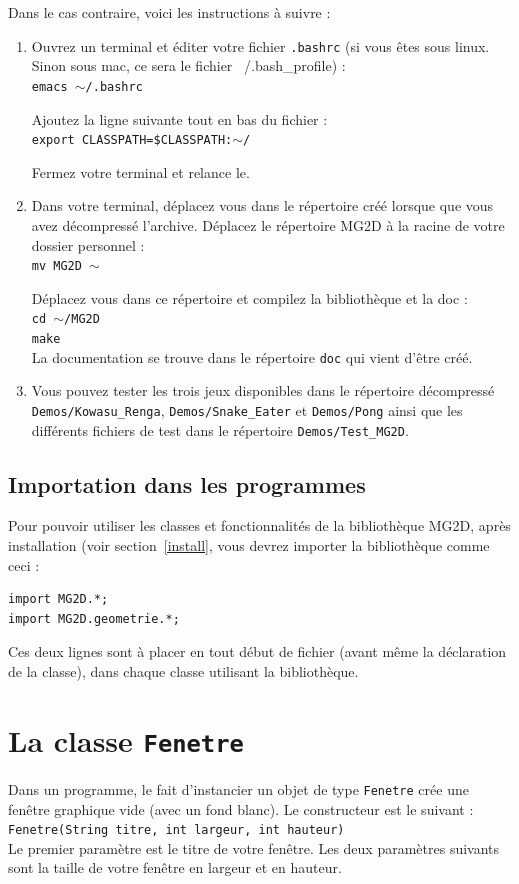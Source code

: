 \documentclass[12pt]{exam}
\begin{document}
Dans le cas contraire, voici les instructions à suivre :
\begin{enumerate}
\item Ouvrez un terminal et éditer votre fichier \texttt{.bashrc} (si vous êtes sous linux. Sinon sous mac, ce sera le fichier ~/.bash\_profile) :\\
\texttt{emacs $\sim$/.bashrc}

Ajoutez la ligne suivante tout en bas du fichier :\\
\texttt{export CLASSPATH=\$CLASSPATH:$\sim$/}

Fermez votre terminal et relance le.

\item Dans votre terminal, déplacez vous dans le répertoire 
créé lorsque que vous avez décompressé l'archive. Déplacez le répertoire MG2D à la racine de votre dossier personnel :\\
\texttt{mv MG2D $\sim$}

Déplacez vous dans ce répertoire et compilez la bibliothèque et la doc :\\
\texttt{cd $\sim$/MG2D}\\
\texttt{make}\\
La documentation se trouve dans le répertoire \texttt{doc} qui vient d'être créé.

\item Vous pouvez tester les trois jeux disponibles dans le répertoire décompressé \texttt{Demos/Kowasu\_Renga}, \texttt{Demos/Snake\_Eater} et \texttt{Demos/Pong} ainsi que les différents fichiers de test dans le répertoire \texttt{Demos/Test\_MG2D}.
\end{enumerate}

\subsection{Importation dans les programmes}
\label{import}
Pour pouvoir utiliser les classes et fonctionnalités de la bibliothèque MG2D, après installation (voir section~\ref{install}, vous devrez importer la bibliothèque comme ceci :
\begin{lstlisting}
import MG2D.*;
import MG2D.geometrie.*;
\end{lstlisting}
Ces deux lignes sont à placer en tout début de fichier (avant même la déclaration de la classe), dans chaque classe utilisant la bibliothèque.

\section{La classe \texttt{Fenetre}}
Dans un programme, le fait d'instancier un objet de type \texttt{Fenetre} crée une fenêtre graphique vide (avec un fond blanc). Le constructeur est le suivant :\\
\texttt{Fenetre(String titre, int largeur, int hauteur)}\\
Le premier paramètre est le titre de votre fenêtre. Les deux paramètres suivants sont la taille de votre fenêtre en largeur et en hauteur.\\
\end{document}
